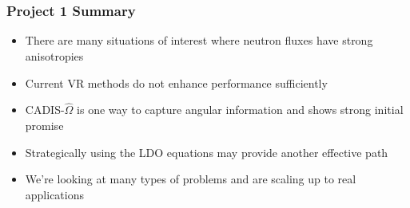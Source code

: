 \documentclass[xcolor=x11names,compress,handout]{beamer}
\renewcommand{\(}{\begin{columns}}
\renewcommand{\)}{\end{columns}}
\newcommand{\<}[1]{\begin{column}{#1}}
\renewcommand{\>}{\end{column}}
\newcommand{\vOmega}{\ensuremath{\hat{\Omega}}}
\begin{document}
\section*{}
\begin{frame}[fragile]
  \frametitle{Project 1 Summary}
  \begin{itemize}
  \item There are many situations of interest where neutron fluxes have strong anisotropies
  \item Current VR methods do not enhance performance sufficiently 
  \pause
  \item CADIS-$\vOmega$ is one way to capture angular information and shows strong initial promise
  \item Strategically using the LDO equations may provide another effective path
  \pause
  \item We're looking at many types of problems and are scaling up to real applications
  \end{itemize}
\end{frame}



\end{document}
